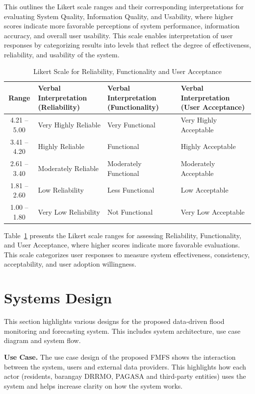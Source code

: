 \documentclass{research}
\begin{document}
This outlines the Likert scale ranges and their corresponding interpretations for evaluating System Quality, Information Quality, and Usability, where higher scores indicate more favorable perceptions of system performance, information accuracy, and overall user usability. This scale enables interpretation of user responses by categorizing results into levels that reflect the degree of effectiveness, reliability, and usability of the system.

\begin{table}[htbp]
\centering
\caption{Likert Scale for Reliability, Functionality and User Acceptance}
\label{tab:likert2}
\begin{tabularx}{\textwidth}{c|X|X|X}
\hline
\textbf{Range} & \textbf{Verbal Interpretation (Reliability)} & \textbf{Verbal Interpretation (Functionality)} & \textbf{Verbal Interpretation (User Acceptance)} \\
\hline
4.21 -- 5.00 & Very Highly Reliable  & Very Functional       & Very Highly Acceptable \\
\hline
3.41 -- 4.20 & Highly Reliable       & Functional            & Highly Acceptable      \\
\hline
2.61 -- 3.40 & Moderately Reliable   & Moderately Functional & Moderately Acceptable  \\
\hline
1.81 -- 2.60 & Low Reliability       & Less Functional       & Low Acceptable         \\
\hline
1.00 -- 1.80 & Very Low Reliability  & Not Functional        & Very Low Acceptable    \\
\hline
\end{tabularx}
\end{table}

Table~\ref{tab:likert2} presents the Likert scale ranges for assessing Reliability, Functionality, and User Acceptance, where higher scores indicate more favorable evaluations. This scale categorizes user responses to measure system effectiveness, consistency, acceptability, and user adoption willingness.

\section{Systems Design}

This section highlights various designs for the proposed data-driven flood monitoring and forecasting system. This includes system architecture, use case diagram and system flow.

\textbf{Use Case.} The use case design of the proposed FMFS shows the interaction between the system, users and external data providers. This highlights how each actor (residents, barangay DRRMO, PAGASA and third-party entities) uses the system and helps increase clarity on how the system works.
\end{document}
